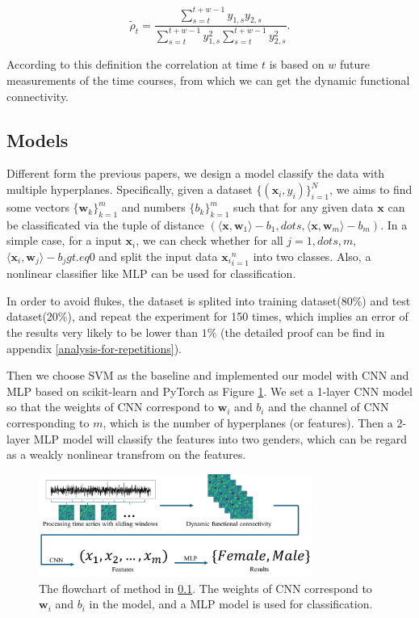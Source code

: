 \documentclass[11pt]{article}
\begin{document}
$$
    \tilde\rho_t = \frac{\sum_{s=t}^{t+w-1} y_{1, s} y_{2, s}}{\sum_{s=t}^{t+w-1} y_{1, s}^2 \sum_{s=t}^{t+w-1} y_{2, s}^2}.
$$

According to this definition the correlation at time $t$ is based on $w$ future measurements of the time courses, from which we can get the dynamic functional connectivity.

\subsection{Models}
\label{sec-Models}

Different form the previous papers, we design a model classify the data with multiple hyperplanes. Specifically, given a dataset $\{(\mathbf{x}_i , y_i)\}_{i=1}^N$, we aims to find some vectors $\{\mathbf{w}_k\}_{k=1}^m$ and numbers $\{b_k\}_{k=1}^m$ such that for any given data $\mathbf{x}$ can be classificated via the tuple of distance $(\langle \mathbf{x}, \mathbf{w}_1 \rangle - b_1, dots, \langle \mathbf{x}, \mathbf{w}_m \rangle - b_m)$. In a simple case, for a input $\mathbf{x}_i$, we can check whether for all $j = 1, dots, m$, $\langle \mathbf{x}_i, \mathbf{w}_j \rangle - b_j gt.eq 0$ and split the input data ${\mathbf{x}_i}_{i=1}^n$ into two classes. Also, a nonlinear classifier like MLP can be used for classification.

In order to avoid flukes, the dataset is splited into training dataset(80\%) and test dataset(20\%), and repeat the experiment for 150 times, which implies an error of the results very likely to be lower than $1\%$ (the detailed proof can be find in appendix \ref{analysis-for-repetitions}).

Then we choose SVM as the baseline and implemented our model with CNN and MLP based on scikit-learn and PyTorch as Figure \ref{figure-model}. We set a 1-layer CNN model so that the weights of CNN correspond to $\mathbf{w}_i$ and $b_i$ and the channel of CNN corresponding to $m$, which is the number of hyperplanes (or features). Then a 2-layer MLP model will classify the features into two genders, which can be regard as a weakly nonlinear transfrom on the features.

\begin{figure}[H]
    \centering
    \includegraphics[width=0.8\textwidth]{./figure/method.png}
    \caption{The flowchart of method in \ref{sec-Models}. The weights of CNN correspond to $\mathbf{w}_i$ and $b_i$ in the model, and a MLP model is used for classification.}
    \label{figure-model}
\end{figure}
\end{document}
